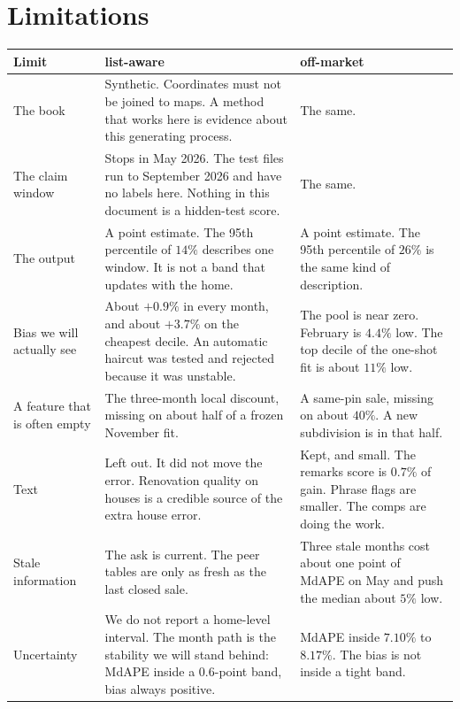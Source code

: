 \documentclass[11pt]{article}
\newcommand{\la}{list-aware}
\newcommand{\om}{off-market}
\begin{document}
\section{Limitations}
\label{sec:limits}

\begin{center}
\small
\begin{tabular}{p{3.3cm}p{5.5cm}p{5.6cm}}
\toprule
Limit & \la & \om \\
\midrule
The book & Synthetic. Coordinates must not be joined to maps. A method that works here is evidence about this generating process. & The same. \\
The claim window & Stops in May 2026. The test files run to September 2026 and have no labels here. Nothing in this document is a hidden-test score. & The same. \\
The output & A point estimate. The 95th percentile of \(14\%\) describes one window. It is not a band that updates with the home. & A point estimate. The 95th percentile of \(26\%\) is the same kind of description. \\
Bias we will actually see & About \(+0.9\%\) in every month, and about \(+3.7\%\) on the cheapest decile. An automatic haircut was tested and rejected because it was unstable. & The pool is near zero. February is \(4.4\%\) low. The top decile of the one-shot fit is about \(11\%\) low. \\
A feature that is often empty & The three-month local discount, missing on about half of a frozen November fit. & A same-pin sale, missing on about \(40\%\). A new subdivision is in that half. \\
Text & Left out. It did not move the error. Renovation quality on houses is a credible source of the extra house error. & Kept, and small. The remarks score is \(0.7\%\) of gain. Phrase flags are smaller. The comps are doing the work. \\
Stale information & The ask is current. The peer tables are only as fresh as the last closed sale. & Three stale months cost about one point of MdAPE on May and push the median about \(5\%\) low. \\
Uncertainty & We do not report a home-level interval. The month path is the stability we will stand behind: MdAPE inside a \(0.6\)-point band, bias always positive. & MdAPE inside \(7.10\%\) to \(8.17\%\). The bias is not inside a tight band. \\
\bottomrule
\end{tabular}
\end{center}
\end{document}
